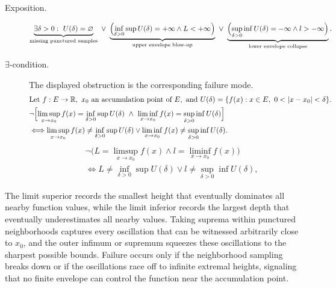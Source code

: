 \begin{remark*}
\begin{description}
  \item[Exposition.]
\[
\underbrace{\exists \delta>0:\ U(\delta)=\varnothing}_{\text{missing punctured samples}}
\ \lor\
\underbrace{\Bigl(\inf_{\delta>0}\sup U(\delta)=+\infty \land L<+\infty\Bigr)}_{\text{upper envelope blow-up}}
\ \lor\
\underbrace{\Bigl(\sup_{\delta>0}\inf U(\delta)=-\infty \land l>-\infty\Bigr)}_{\text{lower envelope collapse}}.
\]


  \item[\(\exists\)-condition.]
  The displayed obstruction is the corresponding failure mode.
  \[
\begin{aligned}
&\text{Let } f:E\to\mathbb{R},\ x_0 \text{ an accumulation point of } E,\ \text{and } U(\delta)=\{f(x):x\in E,\ 0<|x-x_0|<\delta\}.\\
&\neg\Bigl[\limsup_{x\to x_0} f(x)=\inf_{\delta>0}\sup U(\delta)\ \land\ \liminf_{x\to x_0} f(x)=\sup_{\delta>0}\inf U(\delta)\Bigr]\\
&\Longleftrightarrow
\limsup_{x\to x_0} f(x)\ne\inf_{\delta>0}\sup U(\delta)
\lor
\liminf_{x\to x_0} f(x)\ne\sup_{\delta>0}\inf U(\delta).
\end{aligned}
  \]
  \[
\begin{aligned}
&\neg\bigl(L=\limsup_{x\to x_0} f(x)\land l=\liminf_{x\to x_0} f(x)\bigr)\\
&\Longleftrightarrow
L\ne\inf_{\delta>0}\sup U(\delta)
\lor
l\ne\sup_{\delta>0}\inf U(\delta),
\end{aligned}
  \]
\end{description}
\end{remark*}

\begin{remark*}[Interpretation]
The limit superior records the smallest height that eventually dominates all nearby function values, while the limit inferior records the largest depth that eventually underestimates all nearby values. Taking suprema within punctured neighborhoods captures every oscillation that can be witnessed arbitrarily close to $x_0$, and the outer infimum or supremum squeezes these oscillations to the sharpest possible bounds. Failure occurs only if the neighborhood sampling breaks down or if the oscillations race off to infinite extremal heights, signaling that no finite envelope can control the function near the accumulation point.
\end{remark*}

